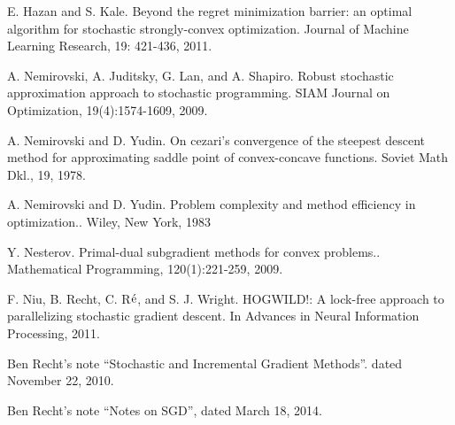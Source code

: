 \begin{thebibliography}{999}
{E. Hazan and S. Kale}. {Beyond the regret minimization barrier: an optimal algorithm for stochastic strongly-convex optimization}. {Journal of Machine Learning Research}, 19: 421-436,  2011.

{A. Nemirovski, A. Juditsky, G. Lan, and A. Shapiro}. {Robust stochastic approximation approach to stochastic programming}. {SIAM Journal on Optimization}, 19(4):1574-1609, 2009.

{A. Nemirovski and D. Yudin}. {On cezari's convergence of the steepest descent method for approximating saddle point of convex-concave functions}. {Soviet Math Dkl.}, 19, 1978. 

{A. Nemirovski and D. Yudin}. {Problem complexity and method efficiency in optimization.}. {Wiley, New York}, 1983

{Y. Nesterov}. {Primal-dual subgradient methods for convex problems.}. {Mathematical Programming}, 120(1):221-259, 2009.

{F. Niu, B. Recht, C. R$\acute{\rm e}$, and S. J. Wright}. {HOGWILD!: A lock-free approach to parallelizing stochastic gradient descent}. {In Advances in Neural Information Processing}, 2011.

 {Ben Recht's note ``Stochastic and Incremental Gradient Methods''}.
{dated November 22, 2010.}

 {Ben Recht's note ``Notes on SGD''},
{dated March 18, 2014.}

\end{thebibliography}

